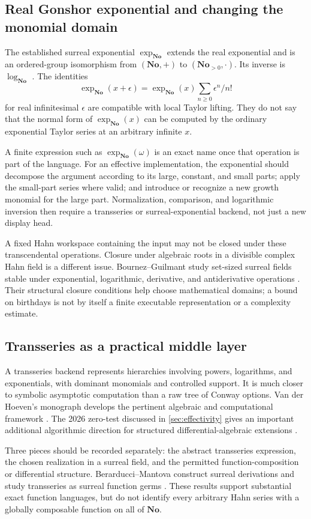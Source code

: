 \documentclass[11pt,letterpaper]{article}
\theoremstyle{definition}\newtheorem{definition}[theorem]{Definition}
\theoremstyle{remark}\newtheorem{remark}[theorem]{Remark}
\newcommand{\No}{\mathbf{No}}\newcommand{\SC}{\mathbf{SC}}
\numberwithin{equation}{section}\setcounter{tocdepth}{2}
\begin{document}
\subsection{Real Gonshor exponential and changing the monomial domain}
The established surreal exponential $\exp_{\No}$ extends the real exponential and is an ordered-group isomorphism from $(\No,+)$ to $(\No_{>0},\cdot)$. Its inverse is $\log_{\No}$ \cite{Gonshor}. The identities
\[
 \exp_{\No}(x+\epsilon)=\exp_{\No}(x)\sum_{n\ge0}\epsilon^n/n!
\]
for real infinitesimal $\epsilon$ are compatible with local Taylor lifting. They do not say that the normal form of $\exp_{\No}(x)$ can be computed by the ordinary exponential Taylor series at an arbitrary infinite $x$.

A finite expression such as $\exp_{\No}(\omega)$ is an exact name once that operation is part of the language. For an effective implementation, the exponential should decompose the argument according to its large, constant, and small parts; apply the small-part series where valid; and introduce or recognize a new growth monomial for the large part. Normalization, comparison, and logarithmic inversion then require a transseries or surreal-exponential backend, not just a new display head.

A fixed Hahn workspace containing the input may not be closed under these transcendental operations. Closure under algebraic roots in a divisible complex Hahn field is a different issue. Bournez--Guilmant study set-sized surreal fields stable under exponential, logarithmic, derivative, and antiderivative operations \cite{BG}. Their structural closure conditions help choose mathematical domains; a bound on birthdays is not by itself a finite executable representation or a complexity estimate.

\subsection{Transseries as a practical middle layer}
A transseries backend represents hierarchies involving powers, logarithms, and exponentials, with dominant monomials and controlled support. It is much closer to symbolic asymptotic computation than a raw tree of Conway options. Van der Hoeven's monograph develops the pertinent algebraic and computational framework \cite{vdH}. The 2026 zero-test discussed in \cref{sec:effectivity} gives an important additional algorithmic direction for structured differential-algebraic extensions \cite{CFH}.

Three pieces should be recorded separately: the abstract transseries expression, the chosen realization in a surreal field, and the permitted function-composition or differential structure. Berarducci--Mantova construct surreal derivations and study transseries as surreal function germs \cite{BMder,BMfun}. These results support substantial exact function languages, but do not identify every arbitrary Hahn series with a globally composable function on all of $\No$.
\end{document}
